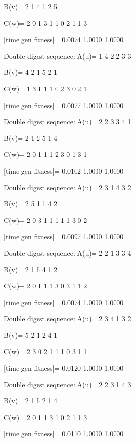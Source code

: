 B(v)=
     2     1     4     1     2     5

C(w)=
     2     0     1     3     1     1     0     2     1     1     3

[time gen fitness]=
    0.0074    1.0000    1.0000

Double digest sequence:
A(u)=
     1     4     2     2     3     3

B(v)=
     4     2     1     5     2     1

C(w)=
     1     3     1     1     1     0     2     3     0     2     1

[time gen fitness]=
    0.0077    1.0000    1.0000

Double digest sequence:
A(u)=
     2     2     3     3     4     1

B(v)=
     2     1     2     5     1     4

C(w)=
     2     0     1     1     1     2     3     0     1     3     1

[time gen fitness]=
    0.0102    1.0000    1.0000

Double digest sequence:
A(u)=
     2     3     1     4     3     2

B(v)=
     2     5     1     1     4     2

C(w)=
     2     0     3     1     1     1     1     1     3     0     2

[time gen fitness]=
    0.0097    1.0000    1.0000

Double digest sequence:
A(u)=
     2     2     1     3     3     4

B(v)=
     2     1     5     4     1     2

C(w)=
     2     0     1     1     1     3     0     3     1     1     2

[time gen fitness]=
    0.0074    1.0000    1.0000

Double digest sequence:
A(u)=
     2     3     4     1     3     2

B(v)=
     5     2     1     2     4     1

C(w)=
     2     3     0     2     1     1     1     0     3     1     1

[time gen fitness]=
    0.0120    1.0000    1.0000

Double digest sequence:
A(u)=
     2     2     3     1     4     3

B(v)=
     2     1     5     2     1     4

C(w)=
     2     0     1     1     3     1     0     2     1     1     3

[time gen fitness]=
    0.0110    1.0000    1.0000

